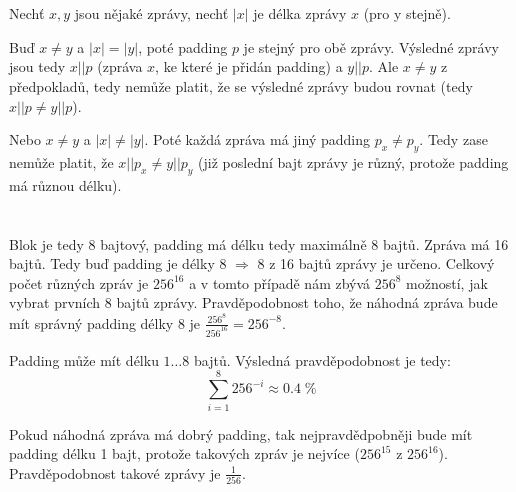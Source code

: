 \documentclass[12pt, a4paper]{article}
\begin{document}
\section{}
Nechť $x,y$ jsou nějaké zprávy, nechť $|x|$ je délka zprávy $x$ (pro y stejně).

Buď $x\neq y$ a $|x|=|y|$, poté padding $p$ je stejný pro obě zprávy. Výsledné zprávy jsou tedy $x||p$ (zpráva $x$, ke které je přidán padding) a $y||p$. Ale $x \neq y$ z předpokladů, tedy nemůže platit, že se výsledné zprávy budou rovnat (tedy $x||p \neq y||p$).

Nebo $x\neq y$ a $|x| \neq |y|$. Poté každá zpráva má jiný padding $p_x \neq p_y$. Tedy zase nemůže platit, že $x||p_x \neq y||p_y$ (již poslední bajt zprávy je různý, protože padding má různou délku).

\section{}
Blok je tedy 8 bajtový, padding má délku tedy maximálně 8 bajtů. Zpráva má 16 bajtů. Tedy buď padding je délky 8 $\Rightarrow$ 8 z 16 bajtů zprávy je určeno. Celkový počet různých zpráv je $256^{16}$ a v tomto případě nám zbývá $256^8$ možností, jak vybrat prvních 8 bajtů zprávy. Pravděpodobnost toho, že náhodná zpráva bude mít správný padding délky 8 je $\frac{256^8}{256^{16}}=256^{-8}$.

Padding může mít délku $1\dots8$ bajtů. Výsledná pravděpodobnost je tedy:
$$\sum_{i=1}^8 256^{-i} \approx 0.4\; \%$$

Pokud náhodná zpráva má dobrý padding, tak nejpravdědpobněji bude mít padding délku 1 bajt, protože takových zpráv je nejvíce ($256^{15}$ z $256^{16}$). Pravděpodobnost takové zprávy je $\frac{1}{256}$.
\end{document}
